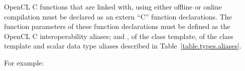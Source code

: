 OpenCL C functions that are linked with, using either offline or online
compilation must be declared as an extern ``C'' function declarations. The function
parameters of these function declarations must be defined as the OpenCL C
interoperability aliases;  and , of the  class template,  of the  class template and scalar data type aliases described in Table~\ref{table.types.aliases}.

For example:


